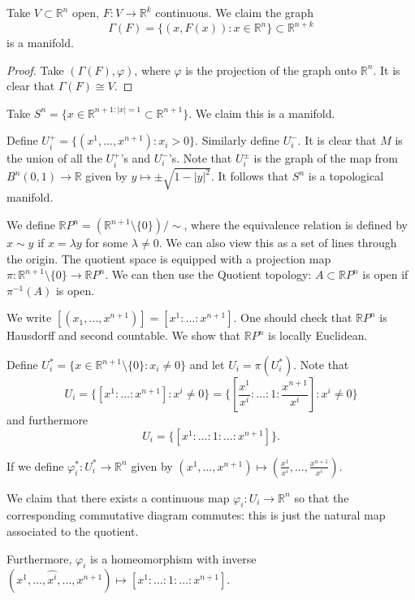 \documentclass[12pt]{scrartcl}
\newcommand{\R}{\mathbb{R}}
\renewcommand{\hat}{\widehat}
\let \phi \varphi
\begin{document}
\begin{thm} Take $V \subset \R^n$ open, $F: V \to \R^k$ continuous.  We claim the graph $$\Gamma(F) = \{(x, F(x)): x \in \R^n\} \subset \R^{n+k}$$ is a manifold. 
\end{thm}
\begin{proof}
Take $(\Gamma(F), \phi)$, where $\phi$ is the projection of the graph onto $\R^n$.   It is clear that $\Gamma(F) \cong V$.
\end{proof}

\begin{example} Take $S^n = \{x \in \R^{n+1 : |x| = 1} \subset \R^{n+1}\}$.  We claim this is a manifold.  

Define $U_i^+ = \{(x^1, \dots, x^{n+1}) : x_i > 0\}$. Similarly define $U_i^-$.  It is clear that $M$ is the union of all the $U_i^+$'s and $U_i^-$'s.  Note that $U_i^{\pm}$ is the graph of the map from $B^n(0, 1) \to \R$ given by $y \mapsto \pm \sqrt{1 - |y|^2}.$  It follows that $S^n$ is a topological manifold.
\end{example}

\begin{example}  We define $\R P^n = (\R^{n+1} \setminus \{0\})/ \sim$, where the equivalence relation is defined by $x \sim y$ if $x = \lambda y$ for some $\lambda \ne 0$.  We can also view this as a set of lines through the origin.  The quotient space is equipped with a projection map $\pi: \R^{n+1}\setminus \{0\} \to \R P^n$.  We can then use the Quotient topology: $A \subset \R P^n$ is open if $\pi^{-1}(A)$ is open.  

We write $[(x_1, \dots, x^{n+1})] = [x^1 : \dots : x^{n+1}]$.  One should check that $\R P^n$ is Hausdorff and second countable. We show that $\R P^n$ is locally Euclidean.  

Define $U_i^* = \{x \in \R^{n+1} \setminus \{0\} : x_i \ne 0\}$ and let $U_i = \pi(U_i^*)$.  Note that 
$$U_i = \{[x^1 : \dots : x^{n+1}] : x^i \ne 0\} = \{[\frac{x^1}{x^i} : \dots : 1 : \frac{x^{n+1}}{x^i}]: x^i \ne 0\}$$
and furthermore
$$U_i = \{[x^1 : \dots : 1 : \dots : x^{n+1}]\}.$$

If we define $\phi_i^* : U_i^* \to \R^n$ given by $(x^1, \dots, x^{n+1}) \mapsto \left (\frac{x^1}{x^i}, \dots, \frac{x^{n+1}}{x^i}\right )$.

We claim that there exists a continuous map $\phi_i: U_i \to \R^n$ so that the corresponding commutative diagram commutes: this is just the natural map associated to the quotient.  

Furthermore, $\phi_i$ is a homeomorphism with inverse $(x^1, \dots, \hat{x^i}, \dots, x^{n+1}) \mapsto [x^1 : \dots : 1 : \dots : x^{n+1}].$
\end{example}
\end{document}
